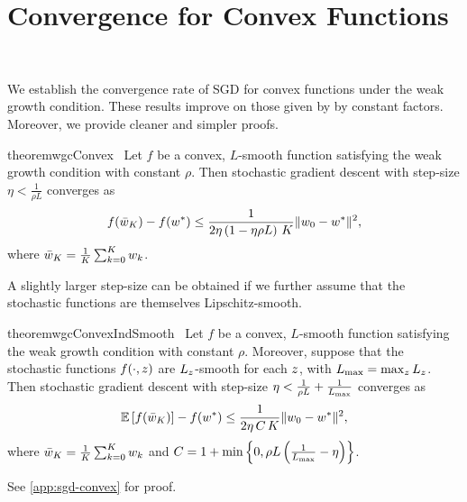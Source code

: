\section{Convergence for Convex Functions}~\label{sec:sgd-convex}

We establish the convergence rate of SGD for convex functions under the weak growth condition. These results improve on those given by \citet{vaswani2019fast} by constant factors. 
Moreover, we provide cleaner and simpler proofs.


\begin{restatable}{theorem}{wgcConvex}~\label{thm:wgc-convex}
    Let \( f \) be a convex, \( L \)-smooth function satisfying the weak growth condition with constant \( \rho  \).
    Then stochastic gradient descent with step-size \( \eta < \frac{1}{\rho L} \) converges as
    \[ f(\bar {w}_K) - f(w^*) \leq \frac{1}{2 \eta \left(1 - \eta \rho L\right) \, K} \|w_0 - w^*\|^2, \]
    where \( \bar {w}_K = \frac{1}{K} \sum_{k=0}^K w_k \). 
\end{restatable}

A slightly larger step-size can be obtained if we further assume that the stochastic functions are themselves Lipschitz-smooth.

\begin{restatable}{theorem}{wgcConvexIndSmooth}~\label{thm:wgc-convex-ind-smooth}
    Let \( f \) be a convex, \( L \)-smooth function satisfying the weak growth condition with constant \( \rho  \).
    Moreover, suppose that the stochastic functions \( f(\cdot, z) \) are \( L_z \)-smooth for each \( z \), with \( L_{\text{max}} = \max_z L_z \).
    Then stochastic gradient descent with step-size \( \eta < \frac{1}{\rho L} + \frac{1}{L_{\text{max}}} \) converges as
    \[ \mathbb{E}\left[f(\bar w_K)\right] - f(w^*) \leq \frac{1}{2\eta \, C \, K} \|w_0 - w^*\|^2,   \]
    where \( \bar {w}_K = \frac{1}{K} \sum_{k=0}^K w_k \) and \( C = 1 + \min \left\{ 0, \rho L \left(\frac{1}{L_{\text{max}}} - \eta \right)\right\} \). 
\end{restatable}

See \autoref{app:sgd-convex} for proof.

\endinput
